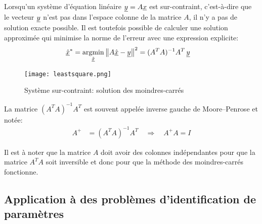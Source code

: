Lorsqu'un système d'équation linéaire $\underline{y} = A \underline{x}$ est sur-contraint, c'est-à-dire que le vecteur $\underline{y}$ n'est pas dans l'espace colonne de la matrice $A$, il n'y a pas de solution exacte possible. Il est toutefois possible de calculer une solution approximée qui minimise la norme de l'erreur avec une expression explicite:
\begin{align}
\col{\hat{x}}^* &= \operatornamewithlimits{argmin}\limits_{\col{\hat{x}}} \left\| A \col{\hat{x}} - \col{y} \right\|^2
= (A^T A)^{-1} A^T \, \col{y}
\end{align}
\begin{figure}[htbp]
	\centering
		\texttt{[image: leastsquare.png]}
	\caption{Système sur-contraint: solution des moindres-carrés}
	\label{fig:leastsquare}
\end{figure}

La matrice $(A^T A)^{-1} A^T$ est souvent appelée inverse gauche de Moore–Penrose et notée:
\begin{align}
A^{+} &= (A^T A)^{-1} A^T  \quad \Rightarrow \quad A^{+} A = I
\end{align}

Il est à noter que la matrice $A$ doit avoir des colonnes indépendantes pour que la matrice $A^T A$ soit inversible et donc pour que la méthode des moindres-carrés fonctionne.


\subsection{Application à des problèmes d'identification de paramètres}


